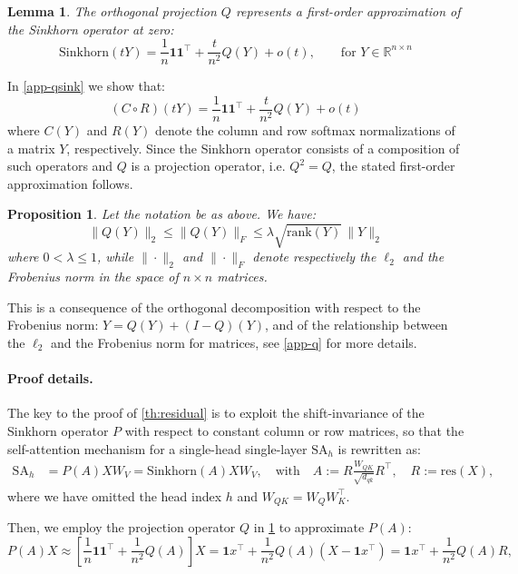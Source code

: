 \documentclass{article}
\theoremstyle{definition}
\theoremstyle{plain}
\newtheorem{lemma}{Lemma}
\newtheorem{proposition}{Proposition}
\begin{document}
\begin{lemma}
\label{lem:Q_projection}
The orthogonal projection $Q$ represents a first-order approximation of the Sinkhorn operator at zero:
$$
\mathrm{Sinkhorn}(tY)=\frac{1}{n}\mathbf{1}\mathbf{1}^\top+\frac{t}{n^2}Q(Y)+o(t), \qquad \text{for } Y \in \mathbb{R}^{n\times n}
$$
\end{lemma}

In \cref{app-qsink} we show that:
$$
(C \circ R)(tY)=\frac{1}{n}\mathbf{1}\mathbf{1}^\top+\frac{t}{n^2}Q(Y)+o(t)
$$
where $C(Y)$ and $R(Y)$ denote the column and row softmax normalizations of a matrix $Y$, respectively.
Since the Sinkhorn operator consists of a composition of such operators and $Q$ is a projection operator, i.e. $Q^2=Q$, {the stated first-order approximation follows}.

\begin{proposition}\label{qprop}
Let the notation be as above. We have:
\[
\|Q(Y)\|_2
\le \|Q(Y)\|_F
\le \lambda \sqrt{\mathrm{rank}(Y)}\,\|Y\|_2
\]
where $0 < \lambda \leq 1$, while $\|\cdot\|_2$ and $\|\cdot\|_F$ denote respectively the $\ell_2$ and the Frobenius norm in the space of $n\times n$ matrices.
\end{proposition}

This is a consequence of the orthogonal decomposition with respect to the Frobenius norm:
$Y = Q(Y) + (I - Q)(Y)$, and of the relationship between the $\ell_2$ and the Frobenius norm for matrices, see \cref{app-q} for more details.

\paragraph{Proof details.} The key to the proof of \cref{th:residual} is to exploit the shift-invariance of the Sinkhorn operator $P$ {with respect to constant column or row matrices, so that} the self-attention mechanism for a single-head single-layer $\mathrm{SA}_h$ {is rewritten} as:
\begin{equation}\label{san_res}
\begin{aligned}
\mathrm{SA}_h &= P(A)XW_V = \mathrm{Sinkhorn}(A)XW_V, \quad
\text{with} \quad A := R \frac{W_{QK}}{\sqrt{d_{qk}}} R^\top, \quad R := \mathrm{res}(X),
\end{aligned}
\end{equation}
where we have omitted the head index $h$ and $W_{QK} = W_Q W_K^\top$.

Then, we employ the projection operator $Q$ in \cref{lem:Q_projection} to approximate $P(A)$:
\begin{equation}\label{P_A}
P(A) X\approx \left[\frac{1}{n}\mathbf{1}\mathbf{1}^\top+\frac{1}{n^2}Q(A)\right]X=
\mathbf{1}x^\top + \frac{1}{n^2}Q(A)(X - \mathbf{1}x^\top)
= \mathbf{1}x^\top +\frac{1}{n^2} Q(A)R,
\end{equation}
\end{document}
